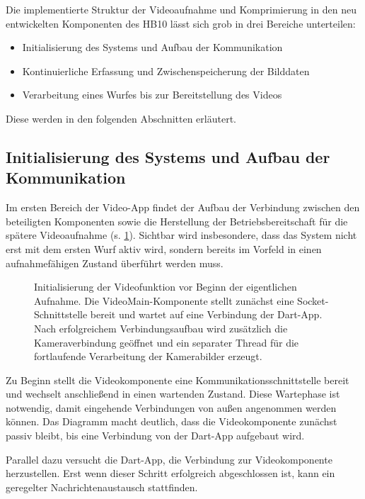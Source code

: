 Die implementierte Struktur der Videoaufnahme und Komprimierung in den neu entwickelten Komponenten des HB10 lässt sich grob in drei Bereiche unterteilen: 

\begin{itemize}
    \item Initialisierung des Systems und Aufbau der Kommunikation 
    \item Kontinuierliche Erfassung und Zwischenspeicherung der Bilddaten
    \item Verarbeitung eines Wurfes bis zur Bereitstellung des Videos
\end{itemize}

Diese werden in den folgenden Abschnitten erläutert.

\subsection{Initialisierung des Systems und Aufbau der Kommunikation}

Im ersten Bereich der Video-App findet der Aufbau der Verbindung zwischen den beteiligten Komponenten sowie die Herstellung der Betriebsbereitschaft für die spätere Videoaufnahme (s. \cref{fig:dartsequenz1}). Sichtbar wird insbesondere, 
dass das System nicht erst mit dem ersten Wurf aktiv wird, sondern bereits im Vorfeld in einen aufnahmefähigen Zustand überführt werden muss.

\begin{figure}[h!]
    \centering
    {\small
    }
    \caption[Initialisierung der Videofunktion]{Initialisierung der Videofunktion vor Beginn der eigentlichen Aufnahme. Die VideoMain-Komponente stellt zunächst eine Socket-Schnittstelle bereit und wartet auf eine Verbindung der Dart-App. 
    Nach erfolgreichem Verbindungsaufbau wird zusätzlich die Kameraverbindung geöffnet und ein separater \mbox{Thread} für die fortlaufende Verarbeitung der Kamerabilder erzeugt.}
    \label{fig:dartsequenz1}
\end{figure}

Zu Beginn stellt die Videokomponente eine Kommunikationsschnittstelle bereit und wechselt anschließend in einen wartenden Zustand. Diese Wartephase ist notwendig, damit eingehende Verbindungen von außen angenommen werden können. Das Diagramm macht deutlich, dass die Videokomponente zunächst passiv bleibt, 
bis eine Verbindung von der Dart-App aufgebaut wird.

Parallel dazu versucht die Dart-App, die Verbindung zur Videokomponente herzustellen. Erst wenn dieser Schritt erfolgreich abgeschlossen ist, kann ein geregelter Nachrichtenaustausch stattfinden.

